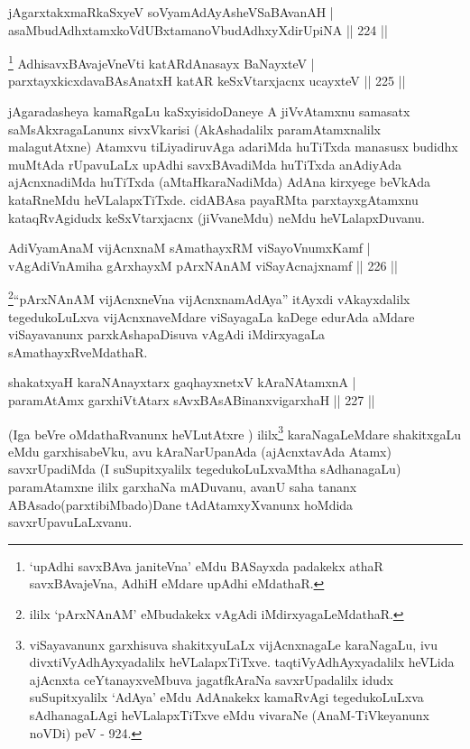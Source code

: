 
\begin{shl}
jAgarxtakxmaRkaSxyeV soV\s yamAdAyAsheVSaBAvanAH |\\
asaMbudAdhxtamxkoVdUBxtamanoVbudAdhxyXdirUpiNA \hfill || 224 ||
\end{shl}

\begin{shl}
\footnote{`upAdhi savxBAva janiteVna' eMdu BASayxda padakekx athaR savxBAvajeVna, AdhiH eMdare upAdhi eMdathaR.} AdhisavxBAvajeVneVti katAR\s \s dAnasayx BaNayxteV |\\
parxtayxkicxdavaBAsAnatxH katAR keSxVtarxjacnx ucayxteV \hfill || 225 ||
\end{shl}

\begin{artha}
jAgaradasheya kamaRgaLu kaSxyisidoDaneye A jiVvAtamxnu samasatx saMsAkxragaLanunx sivxVkarisi (AkAshadalilx paramAtamxnalilx malagutAtxne) Atamxvu tiLiyadiruvAga adariMda huTiTxda manasusx budidhx muMtAda rUpavuLaLx upAdhi savxBAvadiMda huTiTxda anAdiyAda ajAcnxnadiMda huTiTxda (aMtaHkaraNadiMda) AdAna kirxyege beVkAda kataRneMdu heVLalapxTiTxde. cidABAsa payaRMta parxtayxgAtamxnu kataqRvAgidudx keSxVtarxjacnx (jiVvaneMdu) neMdu heVLalapxDuvanu.
\end{artha}

\begin{shl}
AdiVyamAnaM vijAcnxnaM sAmathayxRM viSayoVnumxKamf |\\
vAgAdiVnAmiha gArxhayxM pArxNAnAM viSayAcnajxnamf \hfill || 226 ||
\end{shl}

\begin{artha}
\footnote{ililx `pArxNAnAM' eMbudakekx vAgAdi  iMdirxyagaLeMdathaR.}``pArxNAnAM vijAcnxneVna vijAcnxnamAdAya'' itAyxdi vAkayxdalilx tegedukoLuLxva vijAcnxnaveMdare viSayagaLa kaDege edurAda aMdare viSayavanunx parxkAshapaDisuva vAgAdi iMdirxyagaLa sAmathayxRveMdathaR.
\end{artha}

\begin{shl}
shakatxyaH karaNAnayxtarx gaqhayxnetxV kAraNAtamxnA |\\
paramAtAmx garxhiVtA\s tarx sAvxBAsABinanxvigarxhaH \hfill || 227 ||
\end{shl}

\begin{artha}
(Iga beVre oMdathaRvanunx heVLutAtxre \mdash ) ililx\footnote{viSayavanunx garxhisuva shakitxyuLaLx vijAcnxnagaLe karaNagaLu, ivu divxtiVyAdhAyxyadalilx heVLalapxTiTxve. taqtiVyAdhAyxyadalilx heVLida ajAcnxta ceYtanayxveMbuva jagatfkAraNa savxrUpadalilx idudx suSupitxyalilx `AdAya' eMdu AdAnakekx kamaRvAgi tegedukoLuLxva sAdhanagaLAgi heVLalapxTiTxve eMdu vivaraNe (AnaM-TiVkeyanunx noVDi) peV - 924.} karaNagaLeMdare shakitxgaLu eMdu garxhisabeVku, avu kAraNarUpanAda (ajAcnxtavAda Atamx) savxrUpadiMda (I suSupitxyalilx tegedukoLuLxvaMtha sAdhanagaLu) paramAtamxne ililx garxhaNa mADuvanu, avanU saha tananx ABAsado(parxtibiMbado)Dane tAdAtamxyXvanunx hoMdida savxrUpavuLaLxvanu.
\end{artha}

